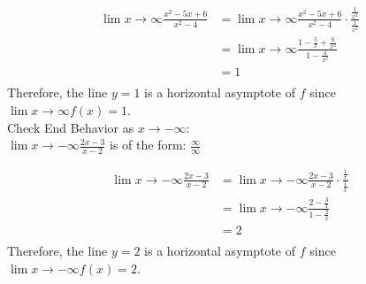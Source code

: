 \documentclass{ximera}
\begin{document}
\begin{problem}
\begin{enumerate}
\begin{explanation}
        \begin{align*}
                   \displaystyle \lim{x \to \infty} \frac{x^2-5x +6}{x^2-4}
          &= \displaystyle \lim{x \to \infty} \frac{x^2-5x +6}{x^2-4} \cdot \frac{\frac{1}{x^{2}}}{\frac{1}{x^{2}}} \\
          &= \displaystyle \lim{x \to \infty}  \frac{1-\frac{5}{x}+\frac{6}{x^2}}{1-\frac{4}{x^{2}}}\\
          &= 1 \\
        \end{align*}
        Therefore, the line $y=1$ is a horizontal asymptote of $f$ since $\displaystyle \lim{x \to \infty} f(x) = 1$.\\[2em]

         Check End Behavior as $x \to -\infty$:\\[1em]
        $\displaystyle \lim{x \to -\infty}\frac{2 x-3}{x-2}$ is of the form: $\frac{\infty}{\infty}$
        
        \begin{align*}
                   \displaystyle \lim{x \to -\infty}\frac{2 x-3}{x-2}	
          &= \displaystyle \lim{x \to -\infty}\frac{2 x-3}{x-2}	 \cdot \frac{\frac{1}{x}}{\frac{1}{x}} \\
          &= \displaystyle \lim{x \to -\infty}  \frac{2-\frac{3}{x}}{1-\frac{2}{x}}\\
          &= 2 \\
        \end{align*}
        Therefore, the line $y=2$ is a horizontal asymptote of $f$ since $\displaystyle \lim{x \to -\infty} f(x) = 2$.\\[2em]  
      \end{explanation}

        \end{enumerate}

  \end{problem}
\end{document}
